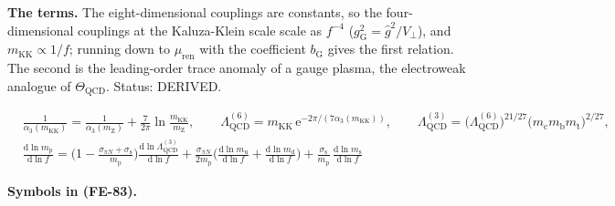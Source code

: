 \documentclass[
  10pt,
]{article}
\begin{document}
\textbf{The terms.} The eight-dimensional couplings are constants, so
the four-dimensional couplings at the Kaluza-Klein scale scale as
\(f^{-4}\) (\(g_{\mathrm{G}}^2 = \hat g^2/V_\perp\)), and
\(m_{\mathrm{KK}} \propto 1/f\); running down to \(\mu_{\mathrm{ren}}\)
with the coefficient \(b_{\mathrm{G}}\) gives the first relation. The
second is the leading-order trace anomaly of a gauge plasma, the
electroweak analogue of \(\Theta_{\mathrm{QCD}}\). Status: DERIVED.

\[
\begin{aligned}
&\frac{1}{\alpha_3(m_{\mathrm{KK}})} = \frac{1}{\alpha_3(m_{\mathrm{Z}})} +
 \frac{7}{2\pi}\ln\frac{m_{\mathrm{KK}}}{m_{\mathrm{Z}}},\qquad
 \Lambda_{\mathrm{QCD}}^{(6)} = m_{\mathrm{KK}}\,\mathrm{e}^{-2\pi/(7\alpha_3(m_{\mathrm{KK}}))},\qquad
 \Lambda_{\mathrm{QCD}}^{(3)} =
 \big(\Lambda_{\mathrm{QCD}}^{(6)}\big)^{21/27}\big(m_{\mathrm{c}}m_{\mathrm{b}}m_{\mathrm{t}}\big)^{2/27},\\
&\frac{\mathrm{d}\ln m_{\mathrm{p}}}{\mathrm{d}\ln f} = \Big(1 - \frac{\sigma_{\pi N} +
 \sigma_{\mathrm{s}}}{m_{\mathrm{p}}}\Big)
 \frac{\mathrm{d}\ln\Lambda_{\mathrm{QCD}}^{(3)}}{\mathrm{d}\ln f}
 + \frac{\sigma_{\pi N}}{2m_{\mathrm{p}}}\Big(\frac{\mathrm{d}\ln m_{\mathrm{u}}}{\mathrm{d}\ln f} +
 \frac{\mathrm{d}\ln m_{\mathrm{d}}}{\mathrm{d}\ln f}\Big)
 + \frac{\sigma_{\mathrm{s}}}{m_{\mathrm{p}}}\,\frac{\mathrm{d}\ln m_{\mathrm{s}}}{\mathrm{d}\ln f}
\end{aligned} \tag{FE-83}
\]

\textbf{Symbols in (FE-83).}
\end{document}
